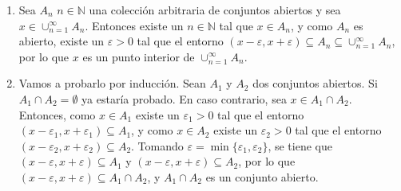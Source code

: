 \documentclass[
  spanish,
  a4paper,
]{scrreport}
\theoremstyle{definition}
\theoremstyle{remark}
\begin{document}
\begin{tcolorbox}[enhanced jigsaw, arc=.35mm, bottomrule=.15mm, bottomtitle=1mm, breakable, colback=white, colbacktitle=quarto-callout-tip-color!10!white, colframe=quarto-callout-tip-color-frame, coltitle=black, left=2mm, leftrule=.75mm, opacityback=0, opacitybacktitle=0.6, rightrule=.15mm, title=\textcolor{quarto-callout-tip-color}{\faLightbulb}\hspace{0.5em}{Solución}, titlerule=0mm, toprule=.15mm, toptitle=1mm]

\begin{enumerate}
\def\labelenumi{\alph{enumi}.}
\item
  Sea \(A_n\) \(n\in\mathbb{N}\) una colección arbitraria de conjuntos
  abiertos y sea \(x\in \cup_{n=1}^\infty A_n\). Entonces existe un
  \(n\in\mathbb{N}\) tal que \(x\in A_n\), y como \(A_n\) es abierto,
  existe un \(\varepsilon>0\) tal que el entorno
  \((x-\varepsilon, x+\varepsilon)\subseteq A_n\subseteq\cup_{n=1}^\infty A_n\),
  por lo que \(x\) es un punto interior de \(\cup_{n=1}^\infty A_n\).
\item
  Vamos a probarlo por inducción. Sean \(A_1\) y \(A_2\) dos conjuntos
  abiertos. Si \(A_1\cap A_2=\emptyset\) ya estaría probado. En caso
  contrario, sea \(x\in A_1\cap A_2\). Entonces, como \(x\in A_1\)
  existe un \(\varepsilon_1>0\) tal que el entorno
  \((x-\varepsilon_1, x+\varepsilon_1)\subseteq A_1\), y como
  \(x\in A_2\) existe un \(\varepsilon_2>0\) tal que el entorno
  \((x-\varepsilon_2, x+\varepsilon_2)\subseteq A_2\). Tomando
  \(\varepsilon=\min\{\varepsilon_1,\varepsilon_2\}\), se tiene que
  \((x-\varepsilon, x+\varepsilon)\subseteq A_1\) y
  \((x-\varepsilon, x+\varepsilon)\subseteq A_2\), por lo que
  \((x-\varepsilon, x+\varepsilon)\subseteq A_1\cap A_2\), y
  \(A_1\cap A_2\) es un conjunto abierto.


\end{enumerate}
\end{tcolorbox}
\end{document}
